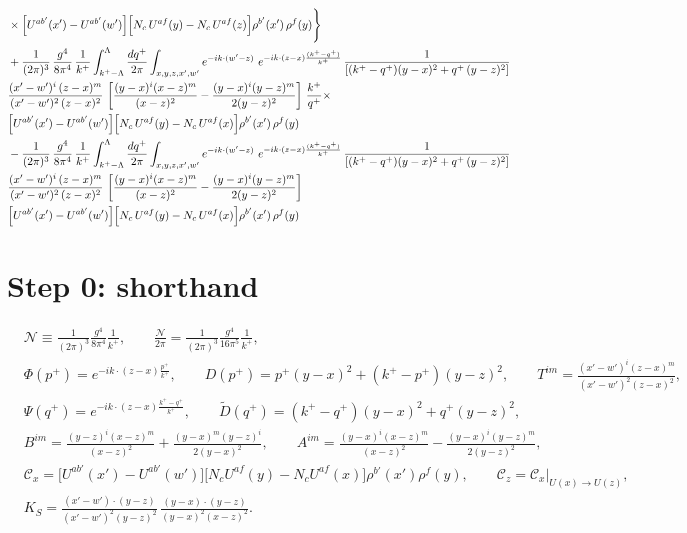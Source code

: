 \documentclass[10pt]{article}
\numberwithin{equation}{section}
\begin{document}
\begin{align}
&\times\Big[U^{ab'}(x')-U^{ab'}(w')\Big]\Big[N_{c}\,U^{af}(y)-N_{c}\,U^{af}(z)\Big]\rho^{b'}(x')\,\rho^{f}(y)\Bigg\}\notag \\ &  + \frac{1}{(2\pi)^{3}}\,\frac{g^{4}}{8\pi^{4}}\,\frac{1}{k^{+}}\int_{k^{+}-\Lambda}^{\Lambda}\frac{dq^{+}}{2\pi}\int_{x,y,z,x',w'}e^{-ik\cdot(w'-z)}\ e^{-ik\cdot(z-x)\frac{(k^{+}-q^{+})}{k^{+}}}\,\frac{1}{\left[(k^{+}-q^{+})(y-x)^{2}+q^{+}\,(y-z)^{2}\right]}\notag \\ & \frac{(x'-w')^{i}\,(z-x)^{m}}{(x'-w')^{2}\,(z-x)^{2}}\,\left[\frac{(y-x)^{i}(x-z)^{m}}{(x-z)^{2}}-\frac{(y-x)^{i}(y-z)^{m}}{2(y-z)^{2}}\right]\,\frac{k^{+}}{q^{+}}\times\notag \\ & \Big[U^{ab'}(x')-U^{ab'}(w')\Big]\Big[N_{c}\,U^{af}(y)-N_{c}\,U^{af}(x)\Big]\rho^{b'}(x')\,\rho^{f}(y)\notag \\ & - \frac{1}{(2\pi)^{3}}\,\frac{g^{4}}{8\pi^{4}}\,\frac{1}{k^{+}}\int_{k^{+}-\Lambda}^{\Lambda}\frac{dq^{+}}{2\pi}\int_{x,y,z,x',w'}e^{-ik\cdot(w'-z)}\ e^{-ik\cdot(z-x)\frac{(k^{+}-q^{+})}{k^{+}}}\,\frac{1}{\left[(k^{+}-q^{+})(y-x)^{2}+q^{+}\,(y-z)^{2}\right]}\notag \\ & \frac{(x'-w')^{i}\,(z-x)^{m}}{(x'-w')^{2}\,(z-x)^{2}}\,\left[\frac{(y-x)^{i}(x-z)^{m}}{(x-z)^{2}}-\frac{(y-x)^{i}(y-z)^{m}}{2(y-z)^{2}}\right]\notag \\ & \Big[U^{ab'}(x')-U^{ab'}(w')\Big]\Big[N_{c}\,U^{af}(y)-N_{c}\,U^{af}(x)\Big]\rho^{b'}(x')\,\rho^{f}(y)
\label{eq:start}
\end{align}

\section{Step 0: shorthand}
\begin{align}
&\mathcal{N}\equiv\frac{1}{(2\pi)^{3}}\frac{g^{4}}{8\pi^{4}}\frac{1}{k^{+}},\qquad \frac{\mathcal{N}}{2\pi}=\frac{1}{(2\pi)^{3}}\frac{g^{4}}{16\pi^{5}}\frac{1}{k^{+}},\\
&\Phi(p^{+})=e^{-ik\cdot(z-x)\frac{p^{+}}{k^{+}}},\qquad D(p^{+})=p^{+}(y-x)^{2}+(k^{+}-p^{+})(y-z)^{2},\qquad T^{im}=\frac{(x'-w')^{i}(z-x)^{m}}{(x'-w')^{2}(z-x)^{2}},\\
&\Psi(q^{+})=e^{-ik\cdot(z-x)\frac{k^{+}-q^{+}}{k^{+}}},\qquad \widetilde D(q^{+})=(k^{+}-q^{+})(y-x)^{2}+q^{+}(y-z)^{2},\\
&B^{im}=\frac{(y-z)^{i}(x-z)^{m}}{(x-z)^{2}}+\frac{(y-x)^{m}(y-z)^{i}}{2(y-x)^{2}},\qquad
A^{im}=\frac{(y-x)^{i}(x-z)^{m}}{(x-z)^{2}}-\frac{(y-x)^{i}(y-z)^{m}}{2(y-z)^{2}},\\
&\mathcal{C}_{x}=\big[U^{ab'}(x')-U^{ab'}(w')\big]\big[N_{c}U^{af}(y)-N_{c}U^{af}(x)\big]\rho^{b'}(x')\rho^{f}(y),\qquad \mathcal{C}_{z}=\mathcal{C}_{x}\big|_{U(x)\to U(z)},\\
&K_{S}=\frac{(x'-w')\cdot(y-z)}{(x'-w')^{2}(y-z)^{2}}\,\frac{(y-x)\cdot(y-z)}{(y-x)^{2}(x-z)^{2}}.
\end{align}
\end{document}
